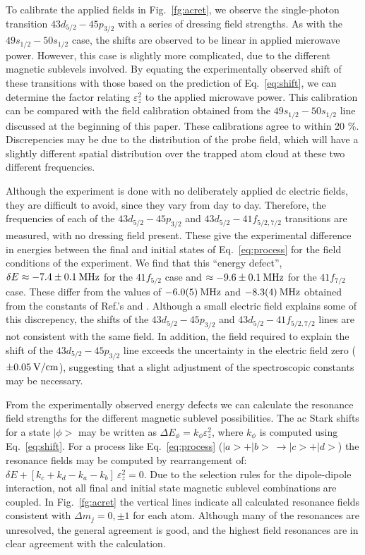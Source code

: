 \documentclass[letterpaper,twocolumn,showpacs,preprintnumbers,amsmath,amssymb,prl,nolongbibliography]{revtex4-2}
\begin{document}
To calibrate the applied fields in Fig.~\ref{fg:acret}, we observe
the single-photon transition $43d_{5/2}-45p_{3/2}$ with a series
of dressing field strengths.
As with the $49s_{1/2}-50s_{1/2}$ case,
the shifts are observed to be linear in applied microwave power.
However, this case is slightly more complicated, due to the different
magnetic sublevels involved.
By equating the experimentally observed shift
of these transitions with those based on the prediction of
Eq.~\ref{eq:shift}, we can determine
the factor relating $\varepsilon_z^2$ to the applied microwave power.
This calibration can be compared with the field calibration
obtained from the $49s_{1/2}-50s_{1/2}$ line
discussed at the beginning
of this paper.
These calibrations agree to within 20 \%.
Discrepencies may be due to the distribution of the
probe field, which will have a slightly different spatial
distribution over the trapped atom cloud at these two different
frequencies.

Although the experiment is done with no deliberately applied
dc electric fields, they are difficult to avoid, since they
vary from day to day.  Therefore, the frequencies of each of
the $43d_{5/2}-45p_{3/2}$ and $43d_{5/2}-41f_{5/2,7/2}$
transitions are measured, with no dressing field present.
These give the experimental difference in energies
between the final and initial states of Eq.~\ref{eq:process}
for the field conditions of the experiment.
We find that this
``energy defect'', $\delta E \approx -7.4 \pm 0.1 \: {\rm MHz}$ for
the $41f_{5/2}$ case and $\approx -9.6 \pm 0.1 \: {\rm MHz}$ for
the $41f_{7/2}$ case.  These differ from the values of
$-6.0(5) \: {\rm MHz}$ and $-8.3(4) \: {\rm MHz}$
obtained from the constants of
Ref.'s \cite{li:2003} and \cite{han:2006}.
Although a small electric field explains some of this
discrepency, the shifts of the $43d_{5/2}-45p_{3/2}$ and
$43d_{5/2}-41f_{5/2,7/2}$ lines are not consistent with
the same field.
In addition, the field required to explain the shift of the
$43d_{5/2}-45p_{3/2}$ line exceeds the uncertainty in
the electric field zero ($\pm 0.05 \: {\rm V/cm}$), suggesting
that a slight adjustment of the spectroscopic constants may
be necessary.

From the experimentally observed energy defects we can calculate
the resonance field strengths for the different magnetic sublevel
possibilities.
The ac Stark shifts for a state $|\phi\!\!>$ may be written
as $\Delta E_{\phi} = k_{\phi} \varepsilon_z^2$, where $k_{\phi}$ is
computed using Eq.~\ref{eq:shift}.
For a process like Eq.~\ref{eq:process}
($|a\!\!>+|b\!\!> \: \rightarrow |c\!\!> + |d\!\!>$)
the resonance fields may be computed by rearrangement of:
$\delta E +  [k_c+k_d-k_a-k_b] \: \varepsilon_z^2 = 0$.
Due to the selection rules for the dipole-dipole interaction,
not all final and initial state magnetic sublevel combinations
are coupled.  In Fig.~\ref{fg:acret} the
vertical lines indicate all calculated resonance
fields consistent with  $\Delta m_{j} =0,\pm 1$ for each atom.
Although many of the resonances are unresolved,
the general agreement is good, and the highest field resonances
are in clear agreement with the calculation.
\end{document}
